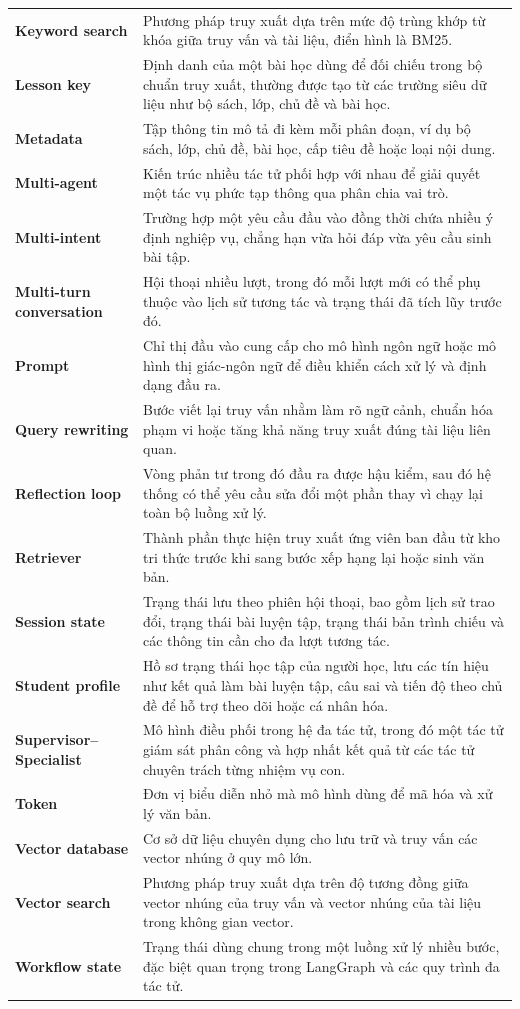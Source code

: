 \documentclass[../DoAn.tex]{subfiles}
\begin{document}
\begin{longtable}{p{3.7cm} p{9.8cm}}
\textbf{Keyword search} & Phương pháp truy xuất dựa trên mức độ trùng khớp từ khóa giữa truy vấn và tài liệu, điển hình là BM25. \\
\textbf{Lesson key} & Định danh của một bài học dùng để đối chiếu trong bộ chuẩn truy xuất, thường được tạo từ các trường siêu dữ liệu như bộ sách, lớp, chủ đề và bài học. \\
\textbf{Metadata} & Tập thông tin mô tả đi kèm mỗi phân đoạn, ví dụ bộ sách, lớp, chủ đề, bài học, cấp tiêu đề hoặc loại nội dung. \\
\textbf{Multi-agent} & Kiến trúc nhiều tác tử phối hợp với nhau để giải quyết một tác vụ phức tạp thông qua phân chia vai trò. \\
\textbf{Multi-intent} & Trường hợp một yêu cầu đầu vào đồng thời chứa nhiều ý định nghiệp vụ, chẳng hạn vừa hỏi đáp vừa yêu cầu sinh bài tập. \\
\textbf{Multi-turn conversation} & Hội thoại nhiều lượt, trong đó mỗi lượt mới có thể phụ thuộc vào lịch sử tương tác và trạng thái đã tích lũy trước đó. \\
\textbf{Prompt} & Chỉ thị đầu vào cung cấp cho mô hình ngôn ngữ hoặc mô hình thị giác-ngôn ngữ để điều khiển cách xử lý và định dạng đầu ra. \\
\textbf{Query rewriting} & Bước viết lại truy vấn nhằm làm rõ ngữ cảnh, chuẩn hóa phạm vi hoặc tăng khả năng truy xuất đúng tài liệu liên quan. \\
\textbf{Reflection loop} & Vòng phản tư trong đó đầu ra được hậu kiểm, sau đó hệ thống có thể yêu cầu sửa đổi một phần thay vì chạy lại toàn bộ luồng xử lý. \\
\textbf{Retriever} & Thành phần thực hiện truy xuất ứng viên ban đầu từ kho tri thức trước khi sang bước xếp hạng lại hoặc sinh văn bản. \\
\textbf{Session state} & Trạng thái lưu theo phiên hội thoại, bao gồm lịch sử trao đổi, trạng thái bài luyện tập, trạng thái bản trình chiếu và các thông tin cần cho đa lượt tương tác. \\
\textbf{Student profile} & Hồ sơ trạng thái học tập của người học, lưu các tín hiệu như kết quả làm bài luyện tập, câu sai và tiến độ theo chủ đề để hỗ trợ theo dõi hoặc cá nhân hóa. \\
\textbf{Supervisor--Specialist} & Mô hình điều phối trong hệ đa tác tử, trong đó một tác tử giám sát phân công và hợp nhất kết quả từ các tác tử chuyên trách từng nhiệm vụ con. \\
\textbf{Token} & Đơn vị biểu diễn nhỏ mà mô hình dùng để mã hóa và xử lý văn bản. \\
\textbf{Vector database} & Cơ sở dữ liệu chuyên dụng cho lưu trữ và truy vấn các vector nhúng ở quy mô lớn. \\
\textbf{Vector search} & Phương pháp truy xuất dựa trên độ tương đồng giữa vector nhúng của truy vấn và vector nhúng của tài liệu trong không gian vector. \\
\textbf{Workflow state} & Trạng thái dùng chung trong một luồng xử lý nhiều bước, đặc biệt quan trọng trong LangGraph và các quy trình đa tác tử. \\
\hline
\end{longtable}
\end{document}

